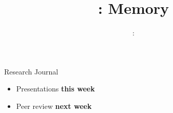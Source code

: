 \usepackage{../../beamerthemeFalmouthGamesAcademy}
\usepackage{multimedia}
\graphicspath{ {../../} }

\lstset{language=Python
}

\usepackage[normalem]{ulem}
\usepackage{wasysym}

\usepackage{algpseudocode}

\usepackage{pdfpages}
\usepackage{qtree}

\usetikzlibrary{arrows,automata}
\usetikzlibrary{tikzmark,calc}



\hypersetup{
pdftex,
pdftitle=\sessionnumber: Memory,
pdfauthor=Ed Powley,
pdfdisplaydoctitle,
pdflang=en-GB
}


\title{\sessionnumber: Memory}
\subtitle{\modulecode: \moduletitle}

\frame{\titlepage} 

\begin{frame}{Research Journal}
	\begin{itemize}
		\item Presentations \textbf{this week}
		\item Peer review \textbf{next week}
	\end{itemize}
\end{frame}

%


